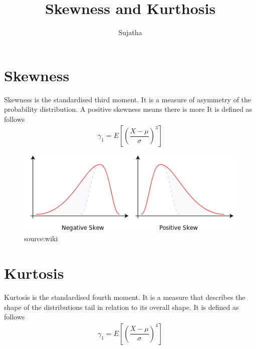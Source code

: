 \documentclass{article}
\author{Sujatha}
\title{Skewness and Kurthosis}
\begin{document}
\maketitle
\section{Skewness}
Skewness is the standardised third moment. It is a measure of asymmetry of the probability distribution. A positive skewness means there is more It is defined as follows
\begin{align*}
 \gamma_1 = E\left[\left(\dfrac{X -\mu}{\sigma}\right)^3  \right]
\end{align*}
\begin{figure}
\begin{center}
 \includegraphics{skewness.png}
 \caption{source:wiki}
\end{center}
\end{figure}
\section{Kurtosis}
Kurtosis is the standardised fourth moment. It is a measure that describes the shape of the distributions tail in relation to its overall 
shape. It is defined as follows
\begin{align*}
 \gamma_1 = E\left[\left(\dfrac{X -\mu}{\sigma}\right)^4  \right]
\end{align*}
\end{document}
